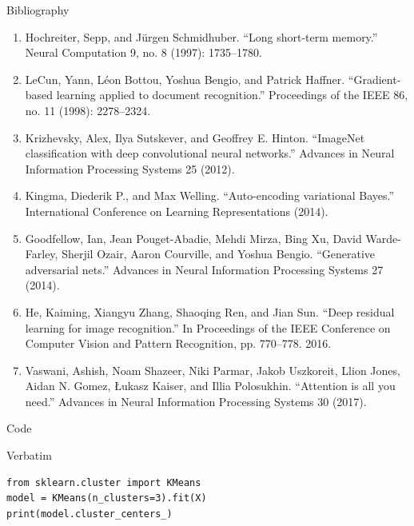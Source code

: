 \begin{frame}[allowframebreaks]{Bibliography}
  \begin{enumerate}
    \item Hochreiter, Sepp, and J\"urgen Schmidhuber. ``Long short-term memory.'' Neural Computation 9, no. 8 (1997): 1735--1780.
    \item LeCun, Yann, L\'eon Bottou, Yoshua Bengio, and Patrick Haffner. ``Gradient-based learning applied to document recognition.'' Proceedings of the IEEE 86, no. 11 (1998): 2278--2324.
    \item Krizhevsky, Alex, Ilya Sutskever, and Geoffrey E. Hinton. ``ImageNet classification with deep convolutional neural networks.'' Advances in Neural Information Processing Systems 25 (2012).
    \item Kingma, Diederik P., and Max Welling. ``Auto-encoding variational Bayes.'' International Conference on Learning Representations (2014).
    \item Goodfellow, Ian, Jean Pouget-Abadie, Mehdi Mirza, Bing Xu, David Warde-Farley, Sherjil Ozair, Aaron Courville, and Yoshua Bengio. ``Generative adversarial nets.'' Advances in Neural Information Processing Systems 27 (2014).
    \item He, Kaiming, Xiangyu Zhang, Shaoqing Ren, and Jian Sun. ``Deep residual learning for image recognition.'' In Proceedings of the IEEE Conference on Computer Vision and Pattern Recognition, pp. 770--778. 2016.
    \item Vaswani, Ashish, Noam Shazeer, Niki Parmar, Jakob Uszkoreit, Llion Jones, Aidan N. Gomez, {\L}ukasz Kaiser, and Illia Polosukhin. ``Attention is all you need.'' Advances in Neural Information Processing Systems 30 (2017).
  \end{enumerate}
\end{frame}

\begin{frame}[fragile]{Code}
  \begin{block}{Verbatim}
\begin{verbatim}
from sklearn.cluster import KMeans
model = KMeans(n_clusters=3).fit(X)
print(model.cluster_centers_)
\end{verbatim}
  \end{block}
\end{frame}
